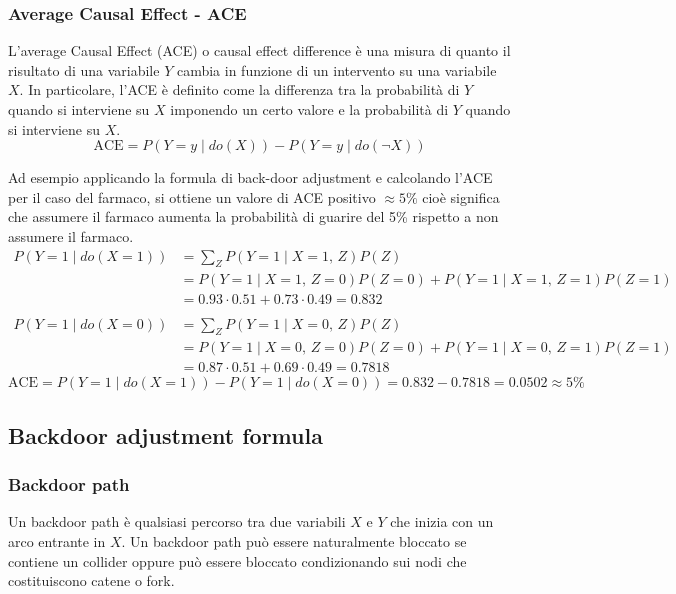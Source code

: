 \subsubsection*{Average Causal Effect - ACE}
L'average Causal Effect (ACE) o causal effect difference è una misura di quanto il risultato di una variabile \(Y\) cambia
in funzione di un intervento su una variabile \(X\). In particolare, l'ACE è definito come la differenza tra la probabilità
di \(Y\) quando si interviene su \(X\) imponendo un certo valore e la probabilità di \(Y\) quando si interviene su \(X\).
\[\text{ACE} = P(Y = y \mid do(X)) - P(Y = y \mid do(\neg X))\]

Ad esempio applicando la formula di back-door adjustment e calcolando l'ACE per il caso del farmaco, si ottiene un valore di
ACE positivo \(\approx 5\%\) cioè significa che assumere il farmaco aumenta la probabilità di guarire del 5\% rispetto a non
assumere il farmaco.
\begin{align*}
	P(Y = 1 \mid do(X = 1)) &= \sum_{Z} P(Y \! = \! 1 \mid X \! = \! 1, \, Z) P(Z) \\
	&= P(Y \! = \! 1 \mid X \! = \! 1, \, Z \! = \! 0) P(Z \! = \! 0) + P(Y \! = \! 1 \mid X \! = \! 1, \, Z \! = \! 1) P(Z \! = \! 1) \\
	&= 0.93 \cdot 0.51 + 0.73 \cdot 0.49 = 0.832 \\
	\\
	P(Y = 1 \mid do(X = 0)) &= \sum_{Z} P(Y \! = \! 1 \mid X \! = \! 0, \,Z) P(Z) \\
	&= P(Y \! = \! 1 \mid X \! = \! 0, \, Z \! = \! 0) P(Z \! = \! 0) + P(Y \! = \! 1 \mid X \! = \! 0, \, Z \! = \! 1) P(Z \! = \! 1) \\
	&= 0.87 \cdot 0.51 + 0.69 \cdot 0.49 = 0.7818
\end{align*}
\[\text{ACE} = P(Y \! = \! 1 \mid do(X \! = \! 1)) - P(Y \! = \! 1 \mid do(X \! = \! 0)) = 0.832 - 0.7818 = 0.0502 \approx 5\%\]

\subsection{Backdoor adjustment formula}
\subsubsection*{Backdoor path}
Un backdoor path è qualsiasi percorso tra due variabili \(X\) e \(Y\) che inizia con un arco entrante in \(X\). Un backdoor path
può essere naturalmente bloccato se contiene un collider oppure può essere bloccato condizionando sui nodi che costituiscono
catene o fork. 

